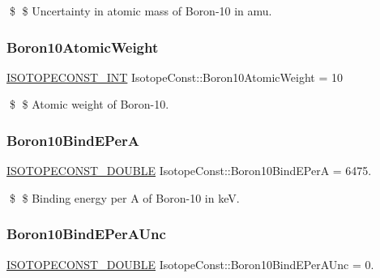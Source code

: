 \$ \$ Uncertainty in atomic mass of Boron-\/10 in amu. \mbox{\label{group___isotope_const-_boron-_b10_ga8df4350efa16d2b23bfc8bd357b40a26}} 
\subsubsection{\texorpdfstring{Boron10\+Atomic\+Weight}{Boron10AtomicWeight}}
{\footnotesize\ttfamily \mbox{\hyperlink{group___isotope_const-_macros_ga5f18360b3e99483a35c32d789e62621c}{I\+S\+O\+T\+O\+P\+E\+C\+O\+N\+S\+T\+\_\+\+I\+NT}} Isotope\+Const\+::\+Boron10\+Atomic\+Weight = 10}

\$ \$ Atomic weight of Boron-\/10. \mbox{\label{group___isotope_const-_boron-_b10_gad83f467d7f2adc946281b553cbed3455}} 
\subsubsection{\texorpdfstring{Boron10\+Bind\+E\+PerA}{Boron10BindEPerA}}
{\footnotesize\ttfamily \mbox{\hyperlink{group___isotope_const-_macros_ga8f45a7272ce02c0b4c65c44636ed719a}{I\+S\+O\+T\+O\+P\+E\+C\+O\+N\+S\+T\+\_\+\+D\+O\+U\+B\+LE}} Isotope\+Const\+::\+Boron10\+Bind\+E\+PerA = 6475.}

\$ \$ Binding energy per A of Boron-\/10 in keV. \mbox{\label{group___isotope_const-_boron-_b10_ga3077fe91c50fc3282f163d8c4ff9d2ae}} 
\subsubsection{\texorpdfstring{Boron10\+Bind\+E\+Per\+A\+Unc}{Boron10BindEPerAUnc}}
{\footnotesize\ttfamily \mbox{\hyperlink{group___isotope_const-_macros_ga8f45a7272ce02c0b4c65c44636ed719a}{I\+S\+O\+T\+O\+P\+E\+C\+O\+N\+S\+T\+\_\+\+D\+O\+U\+B\+LE}} Isotope\+Const\+::\+Boron10\+Bind\+E\+Per\+A\+Unc = 0.}

